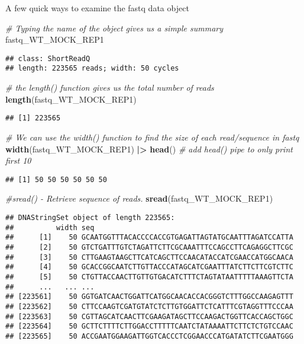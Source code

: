 \documentclass[
]{book}
\newenvironment{Shaded}{\begin{snugshade}}{\end{snugshade}}
\newcommand{\CommentTok}[1]{\textcolor[rgb]{0.56,0.35,0.01}{\textit{#1}}}
\newcommand{\FunctionTok}[1]{\textcolor[rgb]{0.13,0.29,0.53}{\textbf{#1}}}
\newcommand{\NormalTok}[1]{#1}
\newcommand{\SpecialCharTok}[1]{\textcolor[rgb]{0.81,0.36,0.00}{\textbf{#1}}}
\begin{document}
A few quick ways to examine the fastq data object

\begin{Shaded}
\begin{Highlighting}[]
\CommentTok{\# Typing the name of the object gives us a simple summary}
\NormalTok{fastq\_WT\_MOCK\_REP1}
\end{Highlighting}
\end{Shaded}

\begin{verbatim}
## class: ShortReadQ
## length: 223565 reads; width: 50 cycles
\end{verbatim}

\begin{Shaded}
\begin{Highlighting}[]
\CommentTok{\# the length() function gives us the total number of reads}
\FunctionTok{length}\NormalTok{(fastq\_WT\_MOCK\_REP1)}
\end{Highlighting}
\end{Shaded}

\begin{verbatim}
## [1] 223565
\end{verbatim}

\begin{Shaded}
\begin{Highlighting}[]
\CommentTok{\# We can use the width() function to find the size of each read/sequence in fastq}
\FunctionTok{width}\NormalTok{(fastq\_WT\_MOCK\_REP1) }\SpecialCharTok{|\textgreater{}} \FunctionTok{head}\NormalTok{() }\CommentTok{\# add head() pipe to only print first 10}
\end{Highlighting}
\end{Shaded}

\begin{verbatim}
## [1] 50 50 50 50 50 50
\end{verbatim}

\begin{Shaded}
\begin{Highlighting}[]
\CommentTok{\#sread() {-} Retrieve sequence of reads.}
\FunctionTok{sread}\NormalTok{(fastq\_WT\_MOCK\_REP1)}
\end{Highlighting}
\end{Shaded}

\begin{verbatim}
## DNAStringSet object of length 223565:
##          width seq
##      [1]    50 GCAATGGTTTACACCCCACCGTGAGATTAGTATGCAATTTAGATCCATTA
##      [2]    50 GTCTGATTTGTCTAGATTCTTCGCAAATTTCCAGCCTTCAGAGGCTTCGC
##      [3]    50 CTTGAAGTAAGCTTCATCAGCTTCCAACATACCATCGAACCATGGCAACA
##      [4]    50 GCACCGGCAATCTTGTTACCCATAGCATCGAATTTATCTTCTTCGTCTTC
##      [5]    50 CTGTTACCAACTTGTTGTGACATCTTTCTAGTATAATTTTTAAAGTTCTA
##      ...   ... ...
## [223561]    50 GGTGATCAACTGGATTCATGGCAACACCACGGGTCTTTGGCCAAGAGTTT
## [223562]    50 CTTCCAAGTCGATGTATCTCTTGTGGATTCTCATTTCGTAGGTTTCCCAA
## [223563]    50 CGTTAGCATCAACTTCGAAGATAGCTTCCAAGACTGGTTCACCAGCTGGC
## [223564]    50 GCTTCTTTTCTTGGACCTTTTTCAATCTATAAAATTCTTCTCTGTCCAAC
## [223565]    50 ACCGAATGGAAGATTGGTCACCCTCGGAACCCATGATATCTTCGAATGGG
\end{verbatim}
\end{document}

